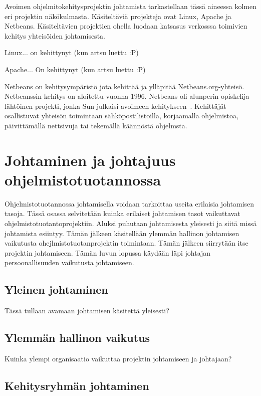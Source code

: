 \documentclass[finnish]{tktltiki2}
\theoremstyle{definition}
\theoremstyle{remark}
\begin{document}
Avoimen ohjelmitokehitysprojektin johtamista tarkastellaan tässä aineessa kolmen eri projektin näkökulmasta. Käsiteltäviä projekteja ovat Linux, Apache ja Netbeans. Käsiteltävien projektien ohella luodaan katsasus verkosssa toimivien kehitys yhteisöiden johtamisesta. 

Linux... on kehittynyt (kun artsu luettu :P)

Apache... On kehittynyt (kun artsu luettu :P)

Netbeans on kehitysympäristö jota kehittää ja ylläpitää Netbeans.org-yhteisö. Netbeanssin kehitys on aloitettu vuonna 1996. Netbeans oli alunperin opiskelija lähtöinen projekti,  jonka  Sun julkaisi avoimeen kehitykseen~\cite{1385637}. Kehittäjät osallistuvat yhteisön toimintaan sähköpostilistoilla, korjaamalla ohjelmistoa, päivittämällä nettsivuja tai tekemällä käännöstä ohjelmsta. 

\section{Johtaminen ja johtajuus ohjelmistotuotannossa}

Ohjelmistotuotannossa johtamisella voidaan tarkoittaa useita erilaisia johtamisen tasoja. Tässä osassa selvitetään kuinka erilaiset johtamisen tasot vaikuttavat ohjelmistotuotantoprojektiin. Aluksi puhutaan johtamisesta yleisesti ja siitä missä johtamista esiintyy. Tämän jälkeen käsitellään ylemmän hallinon johtamisen vaikutusta ohejlmistotuotanprojektin toimintaan. Tämän jälkeen siirrytään itse projektin johtamiseen. Tämän luvun lopussa käydään läpi johtajan persoonallisuuden vaikutusta johtamiseen.

\subsection{Yleinen johtaminen}

Tässä tullaan avamaan johtamisen käsitettä yleisesti?

\subsection{Ylemmän hallinon vaikutus}

Kuinka ylempi organisaatio vaikuttaa projektin johtamiseen ja johtajaan?

\subsection{Kehitysryhmän johtaminen}
\end{document}
